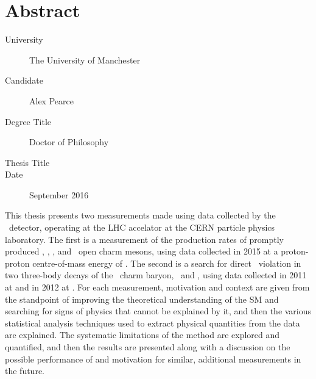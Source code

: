 \chapter{Abstract}

\begin{description}
  \item[University] The University of Manchester
  \item[Candidate] Alex Pearce
  \item[Degree Title] Doctor of Philosophy
  \item[Thesis Title] \thetitle
  \item[Date] September 2016
\end{description}

This thesis presents two measurements made using data collected by the \lhcb\ 
detector, operating at the \acl{LHC} accelator at the CERN particle physics 
laboratory.
The first is a measurement of the production rates of promptly produced 
\PDzero, \PDplus, \PDsplus, and \PDstarp\ open charm mesons, using data 
collected in 2015 at a proton-proton centre-of-mass energy of .
The second is a search for direct \CP\ violation in two three-body decays of 
the \PLambdac\ charm baryon, \pKK\ and \ppipi, using data collected in 2011 at 
\sqrtseq{7} and in 2012 at \sqrtseq{8}.
For each measurement, motivation and context are given from the standpoint of 
improving the theoretical understanding of the \acl{SM} and searching for signs 
of physics that cannot be explained by it, and then the various statistical 
analysis techniques used to extract physical quantities from the data are 
explained.
The systematic limitations of the method are explored and quantified, and then 
the results are presented along with a discussion on the possible performance 
of and motivation for similar, additional measurements in the future.
